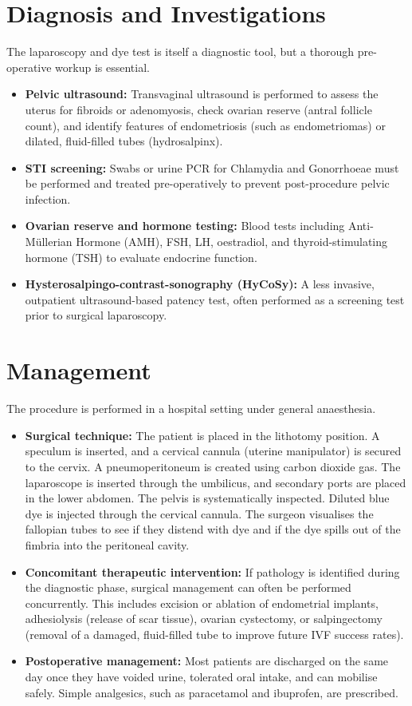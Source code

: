 \section*{Diagnosis and Investigations}
The laparoscopy and dye test is itself a diagnostic tool, but a thorough pre-operative workup is essential.
\begin{itemize}
    \item \textbf{Pelvic ultrasound:} Transvaginal ultrasound is performed to assess the uterus for fibroids or adenomyosis, check ovarian reserve (antral follicle count), and identify features of endometriosis (such as endometriomas) or dilated, fluid-filled tubes (hydrosalpinx).
    \item \textbf{STI screening:} Swabs or urine PCR for Chlamydia and Gonorrhoeae must be performed and treated pre-operatively to prevent post-procedure pelvic infection.
    \item \textbf{Ovarian reserve and hormone testing:} Blood tests including Anti-Müllerian Hormone (AMH), FSH, LH, oestradiol, and thyroid-stimulating hormone (TSH) to evaluate endocrine function.
    \item \textbf{Hysterosalpingo-contrast-sonography (HyCoSy):} A less invasive, outpatient ultrasound-based patency test, often performed as a screening test prior to surgical laparoscopy.
\end{itemize}

\section*{Management}
The procedure is performed in a hospital setting under general anaesthesia.
\begin{itemize}
    \item \textbf{Surgical technique:} The patient is placed in the lithotomy position. A speculum is inserted, and a cervical cannula (uterine manipulator) is secured to the cervix. A pneumoperitoneum is created using carbon dioxide gas. The laparoscope is inserted through the umbilicus, and secondary ports are placed in the lower abdomen. The pelvis is systematically inspected. Diluted blue dye is injected through the cervical cannula. The surgeon visualises the fallopian tubes to see if they distend with dye and if the dye spills out of the fimbria into the peritoneal cavity.
    \item \textbf{Concomitant therapeutic intervention:} If pathology is identified during the diagnostic phase, surgical management can often be performed concurrently. This includes excision or ablation of endometrial implants, adhesiolysis (release of scar tissue), ovarian cystectomy, or salpingectomy (removal of a damaged, fluid-filled tube to improve future IVF success rates).
    \item \textbf{Postoperative management:} Most patients are discharged on the same day once they have voided urine, tolerated oral intake, and can mobilise safely. Simple analgesics, such as paracetamol and ibuprofen, are prescribed.
\end{itemize}

